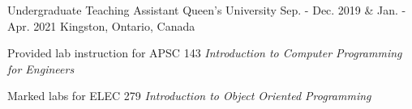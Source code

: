 \begin{cventries}
  \cventry
    {Undergraduate Teaching Assistant} %
    {Queen's University} %
    {Sep. - Dec. 2019 \& Jan. - Apr. 2021} %
    {Kingston, Ontario, Canada} %
    {
      \begin{cvitems} %
        \item{Provided lab instruction for APSC 143 \textit{Introduction to Computer Programming for Engineers}}
        \item{Marked labs for ELEC 279 \textit{Introduction to Object Oriented Programming}}
      \end{cvitems}
    }


\end{cventries}
